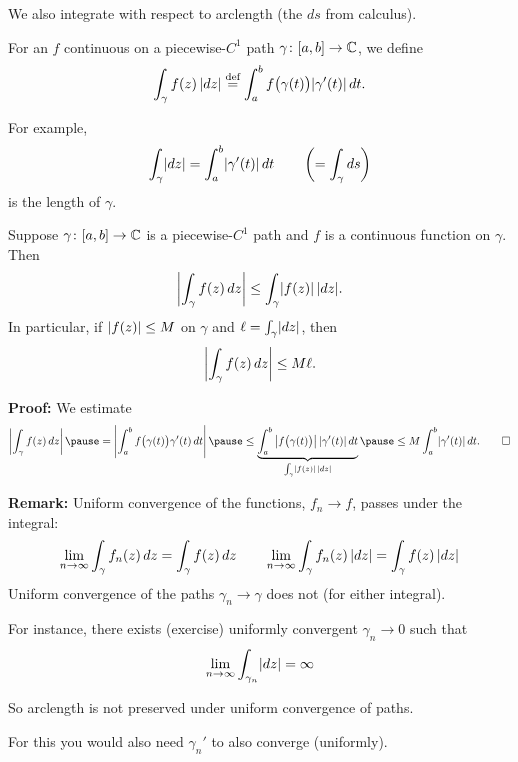 \documentclass[10pt,aspectratio=169]{beamer}
\begin{document}
\begin{frame}
We also integrate with respect to arclength (the $ds$ from calculus).

\medskip
\pause

For an $f$ continuous on a piecewise-$C^1$ path $\gamma \colon [a,b] \to {\mathbb{C}}$,
we define
\[
\int_\gamma f(z) \, \lvert {dz} \rvert
\overset{\text{def}}{=}
\int_a^b f\bigl( \gamma(t) \bigr) \lvert {\gamma'(t)} \rvert \, dt .
\]

\pause

For example,
\[
\int_\gamma \lvert {dz} \rvert =
\int_a^b \lvert {\gamma'(t)} \rvert \, dt
\qquad
\left(
=
\int_\gamma ds \right)
\]
is the length of $\gamma$.
\end{frame}

\begin{frame}
\begin{proposition}
Suppose $\gamma \colon [a,b] \to {\mathbb{C}}$ is 
a piecewise-$C^1$ path and $f$ is a continuous function on
$\gamma$.  Then
\begin{equation*}
\left\lvert {\int_\gamma f(z) \, dz} \right\rvert \leq \int_\gamma \lvert {f(z)} \rvert \, \lvert {dz} \rvert .
\end{equation*}
\pause
In particular, if $\lvert {f(z)} \rvert \leq M$ on $\gamma$ and $\ell = \int_{\gamma} \lvert {dz} \rvert$, then
\begin{equation*}
\left\lvert {\int_\gamma f(z) \, dz} \right\rvert \leq M \ell .
\end{equation*}
\end{proposition} 
\pause

\textbf{Proof:}
We estimate
\[
\abs{\int_\gamma f(z) \, dz}
\pause
=
\abs{\int_a^b f\bigl( \gamma(t) \bigr) \gamma'(t) \, dt}
\pause
\leq
\underbrace{\int_a^b \abs{ f\bigl( \gamma(t) \bigr) }  \sabs{ \gamma'(t) }
\, dt}_{\int_\gamma \sabs{f(z)} \, \sabs{dz}}
\pause
\leq
M
\int_a^b \sabs{ \gamma'(t) } \, dt .
\qed
\]
\end{frame}

\begin{frame}
\textbf{Remark:}
Uniform convergence of the functions, $f_n \to f$, passes under the
integral:
\[
\lim_{n\to\infty} \int_{\gamma} f_n(z) \, dz
=
\int_{\gamma} f(z) \, dz
\qquad
\lim_{n\to\infty} \int_{\gamma} f_n(z) \, \lvert {dz} \rvert
=
\int_{\gamma} f(z) \, \lvert {dz} \rvert
\]
\pause
Uniform convergence of the paths $\gamma_n \to \gamma$ does not (for either
integral).

\pause
\medskip
For instance, there exists (exercise) uniformly convergent $\gamma_n \to 0$ such that
\[
\lim_{n\to\infty} \int_{\gamma_n} \lvert {dz} \rvert = \infty
\]

\pause

So arclength is not preserved under uniform convergence of paths.

\medskip
\pause

For this you would also need $\gamma_n'$ to also converge (uniformly).
\end{frame}
\end{document}
